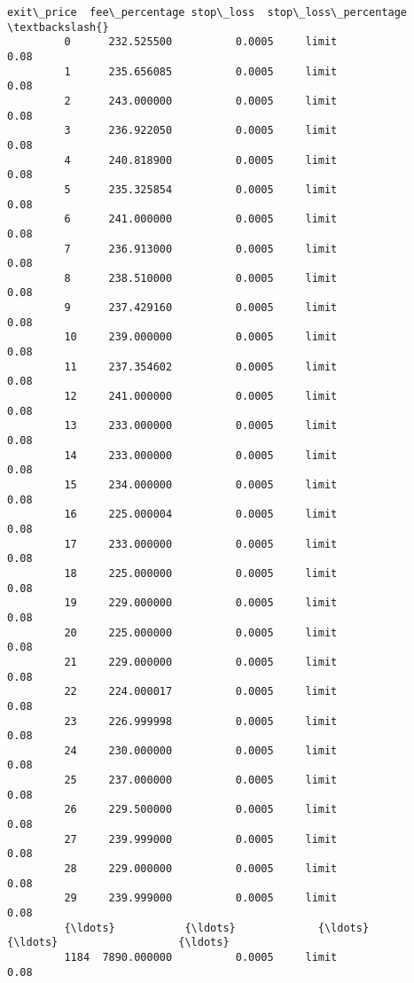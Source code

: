 \documentclass[11pt]{article}
\begin{document}
\begin{Verbatim}[commandchars=\\\{\}]
                exit\_price  fee\_percentage stop\_loss  stop\_loss\_percentage  \textbackslash{}
         0      232.525500          0.0005     limit                  0.08   
         1      235.656085          0.0005     limit                  0.08   
         2      243.000000          0.0005     limit                  0.08   
         3      236.922050          0.0005     limit                  0.08   
         4      240.818900          0.0005     limit                  0.08   
         5      235.325854          0.0005     limit                  0.08   
         6      241.000000          0.0005     limit                  0.08   
         7      236.913000          0.0005     limit                  0.08   
         8      238.510000          0.0005     limit                  0.08   
         9      237.429160          0.0005     limit                  0.08   
         10     239.000000          0.0005     limit                  0.08   
         11     237.354602          0.0005     limit                  0.08   
         12     241.000000          0.0005     limit                  0.08   
         13     233.000000          0.0005     limit                  0.08   
         14     233.000000          0.0005     limit                  0.08   
         15     234.000000          0.0005     limit                  0.08   
         16     225.000004          0.0005     limit                  0.08   
         17     233.000000          0.0005     limit                  0.08   
         18     225.000000          0.0005     limit                  0.08   
         19     229.000000          0.0005     limit                  0.08   
         20     225.000000          0.0005     limit                  0.08   
         21     229.000000          0.0005     limit                  0.08   
         22     224.000017          0.0005     limit                  0.08   
         23     226.999998          0.0005     limit                  0.08   
         24     230.000000          0.0005     limit                  0.08   
         25     237.000000          0.0005     limit                  0.08   
         26     229.500000          0.0005     limit                  0.08   
         27     239.999000          0.0005     limit                  0.08   
         28     229.000000          0.0005     limit                  0.08   
         29     239.999000          0.0005     limit                  0.08   
         {\ldots}           {\ldots}             {\ldots}       {\ldots}                   {\ldots}   
         1184  7890.000000          0.0005     limit                  0.08   

\end{Verbatim}
\end{document}
